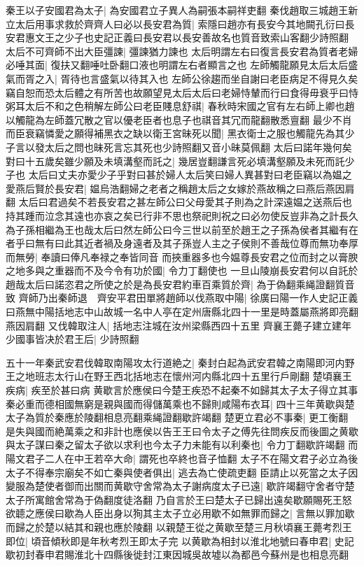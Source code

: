 秦王以子安國君為太子|{
	為安國君立子異人為嗣張本嗣祥吏翻}
秦伐趙取三城趙王新立太后用事求救於齊齊人曰必以長安君為質|{
	索隱曰趙亦有長安今其地闕孔衍曰長安君惠文王之少子也史記正義曰長安君以長安善故名也質音致索山客翻少詩照翻}
太后不可齊師不出大臣彊諫|{
	彊諫猶力諫也}
太后明謂左右曰復言長安君為質者老婦必唾其面|{
	復扶又翻唾吐卧翻口液也明謂左右者顯言之也}
左師觸龍願見太后太后盛氣而胥之入|{
	胥待也言盛氣以待其入也}
左師公徐趨而坐自謝曰老臣病足不得見久矣竊自恕而恐太后體之有所苦也故願望見太后太后曰老婦恃輦而行曰食得毋衰乎曰恃粥耳太后不和之色稍解左師公曰老臣賤息舒祺|{
	春秋時宋國之官有左右師上卿也趙以觸龍為左師蓋冗散之官以優老臣者也息子也祺音其冗而龍翻散悉亶翻}
最少不肖而臣衰竊憐愛之願得補黑衣之缺以衛王宮昧死以聞|{
	黑衣衛士之服也觸龍先為其少子言以發太后之問也昧死言忘其死也少詩照翻又音小昧莫佩翻}
太后曰諾年幾何矣對曰十五歲矣雖少願及未填溝壑而託之|{
	幾居豈翻謙言死必填溝壑願及未死而託少子也}
太后曰丈夫亦愛少子乎對曰甚於婦人太后笑曰婦人異甚對曰老臣竊以為媪之愛燕后賢於長安君|{
	媪烏浩翻婦之老者之稱趙太后之女嫁於燕故稱之曰燕后燕因肩翻}
太后曰君過矣不若長安君之甚左師公曰父母愛其子則為之計深遠媪之送燕后也持其踵而泣念其遠也亦哀之矣已行非不思也祭祀則祝之曰必勿使反豈非為之計長久為子孫相繼為王也哉太后曰然左師公曰今三世以前至於趙王之子孫為侯者其繼有在者乎曰無有曰此其近者禍及身遠者及其子孫豈人主之子侯則不善哉位尊而無功奉厚而無勞|{
	奉讀曰俸凡奉禄之奉皆同音}
而挾重器多也今媪尊長安君之位而封之以膏腴之地多與之重器而不及今令有功於國|{
	令力丁翻使也}
一旦山陵崩長安君何以自託於趙哉太后曰諾恣君之所使之於是為長安君約車百乘質於齊|{
	為于偽翻乘䋲證翻質音致}
齊師乃出秦師退　齊安平君田單將趙師以伐燕取中陽|{
	徐廣曰陽一作人史記正義曰燕無中陽括地志中山故城一名中人亭在定州唐縣北四十一里是時蓋屬燕將即亮翻燕因肩翻}
又伐韓取注人|{
	括地志注城在汝州梁縣西四十五里}
齊襄王薨子建立建年少國事皆决於君王后|{
	少詩照翻}


五十一年秦武安君伐韓取南陽攻太行道絶之|{
	秦封白起為武安君韓之南陽即河内野王之地班志太行山在野王西北括地志在懷州河内縣北四十五里行戶剛翻}
楚頃襄王疾病|{
	疾至於甚曰病}
黄歇言於應侯曰今楚王疾恐不起秦不如歸其太子太子得立其事秦必重而德相國無窮是親與國而得儲萬乘也不歸則咸陽布衣耳|{
	四十三年黄歇與楚太子為質於秦應於陵翻相息亮翻乘䋲證翻歇許竭翻}
楚更立君必不事秦|{
	更工衡翻}
是失與國而絶萬乘之和非計也應侯以告王王曰令太子之傅先往問疾反而後圖之黄歇與太子謀曰秦之留太子欲以求利也今太子力未能有以利秦也|{
	令力丁翻歇許竭翻}
而陽文君子二人在中王若卒大命|{
	謂死也卒終也音子恤翻}
太子不在陽文君子必立為後太子不得奉宗廟矣不如亡秦與使者俱出|{
	逃去為亡使疏吏翻}
臣請止以死當之太子因變服為楚使者御而出關而黄歇守舍常為太子謝病度太子已遠|{
	歇許竭翻守舍者守楚太子所寓館舍常為于偽翻度徒洛翻}
乃自言於王曰楚太子已歸出遠矣歇願賜死王怒欲聼之應侯曰歇為人臣出身以狥其主太子立必用歇不如無罪而歸之|{
	言無以罪加歇而歸之於楚以結其和親也應於陵翻}
以親楚王從之黄歇至楚三月秋頃襄王薨考烈王即位|{
	頃音傾秋即是年秋考烈王即太子完}
以黄歇為相封以淮北地號曰春申君|{
	史記歇初封春申君賜淮北十四縣後徙封江東因城吳故墟以為都邑今蘇州是也相息亮翻}


